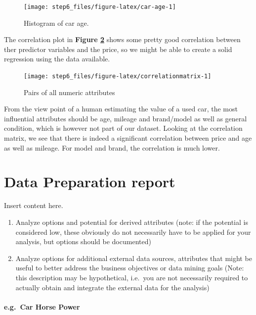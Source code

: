 \documentclass[sigchi]{acmart}
\def\tightlist{}
\begin{document}
\begin{figure}
\texttt{[image: step6\_files/figure-latex/car-age-1]} \caption{Histogram of car age.}\label{fig:car-age}
\end{figure}

The correlation plot in \textbf{Figure \ref{fig:correlationmatrix}} shows some pretty good correlation between ther predictor variables and the price, so we might be able to create a solid regression using the data available.

\begin{figure}
\texttt{[image: step6\_files/figure-latex/correlationmatrix-1]} \caption{Pairs of all numeric attributes}\label{fig:correlationmatrix}
\end{figure}

From the view point of a human estimating the value of a used car, the most influential attributes should be age, mileage and brand/model as well as general condition, which is however not part of our dataset. Looking at the correlation matrix, we see that there is indeed a significant correlation between price and age as well as mileage. For model and brand, the correlation is much lower.

\hypertarget{data-preparation-report}{%
\section{Data Preparation report}\label{data-preparation-report}}

Insert content here.

\begin{enumerate}
\def\labelenumi{\alph{enumi}.}
\tightlist
\item
  Analyze options and potential for derived attributes (note: if the potential is considered low, these obviously do not necessarily have to be applied for your analysis, but options should be documented)
\item
  Analyze options for additional external data sources, attributes that might be useful to better address the business objectives or data mining goals (Note: this description may be hypothetical, i.e.~you are not necessarily required to actually obtain and integrate the external data for the analysis)
\end{enumerate}

\hypertarget{e.g.car-horse-power}{%
\paragraph{e.g.~Car Horse Power}\label{e.g.car-horse-power}}
\end{document}
